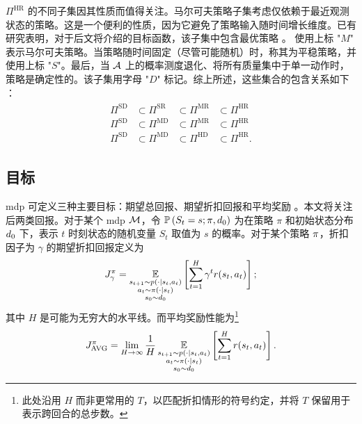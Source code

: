 $\Pi^{\text{HR}}$ 的不同子集因其性质而值得关注。马尔可夫策略子集考虑仅依赖于最近观测状态的策略。这是一个便利的性质，因为它避免了策略输入随时间增长维度。已有研究表明，对于后文将介绍的目标函数，该子集中包含最优策略 \cite[Theorem~6.2.10 and Theorem~8.1.2]{puterman1994markov}。
使用上标 "$M$" 表示马尔可夫策略。当策略随时间固定（尽管可能随机）时，称其为平稳策略，并使用上标 "$S$"。最后，当 $\mathcal{A}$ 上的概率测度退化、将所有质量集中于单一动作时，策略是确定性的。该子集用字母 "$D$" 标记。综上所述，这些集合的包含关系如下 \cite[Section 2.1.5]{puterman1994markov}：
\begin{align*}
    \begin{array}{cccc}
         \Pi^{\text{SD}}&\subset\Pi^{\text{SR}}&\subset\Pi^{\text{MR}}&\subset\Pi^{\text{HR}}  \\
         \Pi^{\text{SD}}&\subset\Pi^{\text{MD}}&\subset\Pi^{\text{MR}}&\subset\Pi^{\text{HR}}\\
         \Pi^{\text{SD}}&\subset\Pi^{\text{MD}}&\subset\Pi^{\text{HD}}&\subset\Pi^{\text{HR}}.
    \end{array}
\end{align*}


\subsection{目标}
\label{subsec:objective}
\gls{mdp} 可定义三种主要目标：期望总回报、期望折扣回报和平均奖励 \cite{puterman1994markov}。本文将关注后两类回报。对于某个 \gls{mdp} $\mathcal{M}$，令 $\mathbb{P}\left(S_t=s; \pi,d_0\right)$ 为在策略 $\pi$ 和初始状态分布 $d_0$ 下，表示 $t$ 时刻状态的随机变量 $S_t$ 取值为 $s$ 的概率。对于某个策略 $\pi$，折扣因子为 $\gamma$ 的期望折扣回报定义为
\begin{align}
\label{eq:discounted_reward}
    \expectedreturn[\gamma] = \expectedvalue_{\substack{s_{t+1}\sim p(\cdot\vert s_t,a_t)\\a_t\sim\pi(\cdot\vert s_t)\\s_0\sim \initialstatedistribution}}\left[\sum_{t=1}^H \gamma^t r(s_t,a_t) \right];
\end{align}
其中 $H$ 是可能为无穷大的水平线。而平均奖励性能为\footnote{此处沿用 $H$ 而非更常用的 $T$，以匹配折扣情形的符号约定，并将 $T$ 保留用于表示跨回合的总步数。}
\begin{align*}
    \averagereturnfunction = \lim_{H\rightarrow \infty}\frac{1}{H}\expectedvalue_{\substack{s_{t+1}\sim p(\cdot\vert s_t,a_t)\\a_t\sim\pi(\cdot\vert s_t)\\s_0\sim \initialstatedistribution}}\left[\sum_{t=1}^H r(s_t,a_t) \right].
\end{align*}

